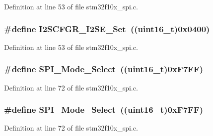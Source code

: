 Definition at line 53 of file stm32f10x\+\_\+spi.\+c.

\subsubsection[{\texorpdfstring{I2\+S\+C\+F\+G\+R\+\_\+\+I2\+S\+E\+\_\+\+Set}{I2SCFGR_I2SE_Set}}]{\setlength{\rightskip}{0pt plus 5cm}\#define I2\+S\+C\+F\+G\+R\+\_\+\+I2\+S\+E\+\_\+\+Set~(({\bf uint16\+\_\+t})0x0400)}\hypertarget{group___s_p_i___private___defines_gaded516c1bc1f0cb578174af3e296621b}{}\label{group___s_p_i___private___defines_gaded516c1bc1f0cb578174af3e296621b}


Definition at line 53 of file stm32f10x\+\_\+spi.\+c.

\subsubsection[{\texorpdfstring{S\+P\+I\+\_\+\+Mode\+\_\+\+Select}{SPI_Mode_Select}}]{\setlength{\rightskip}{0pt plus 5cm}\#define S\+P\+I\+\_\+\+Mode\+\_\+\+Select~(({\bf uint16\+\_\+t})0x\+F7\+F\+F)}\hypertarget{group___s_p_i___private___defines_ga71da9dd90bf7bfb6ed1748a1e181677a}{}\label{group___s_p_i___private___defines_ga71da9dd90bf7bfb6ed1748a1e181677a}


Definition at line 72 of file stm32f10x\+\_\+spi.\+c.

\subsubsection[{\texorpdfstring{S\+P\+I\+\_\+\+Mode\+\_\+\+Select}{SPI_Mode_Select}}]{\setlength{\rightskip}{0pt plus 5cm}\#define S\+P\+I\+\_\+\+Mode\+\_\+\+Select~(({\bf uint16\+\_\+t})0x\+F7\+F\+F)}\hypertarget{group___s_p_i___private___defines_ga71da9dd90bf7bfb6ed1748a1e181677a}{}\label{group___s_p_i___private___defines_ga71da9dd90bf7bfb6ed1748a1e181677a}


Definition at line 72 of file stm32f10x\+\_\+spi.\+c.

